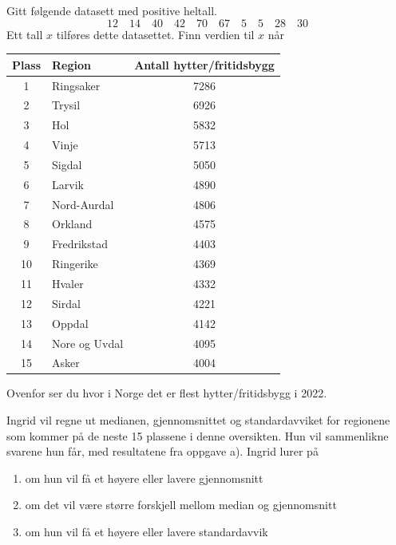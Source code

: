 Gitt følgende datasett med positive heltall.
\[ 12 \quad 14 \quad 40 \quad 42 \quad 70 \quad 67 \quad 5 \quad 5 \quad 28 \quad 30 \]
Ett tall $x$ tilføres dette datasettet. Finn verdien til $x$ når
\newpage
{}
\begin{table}[h]
	\centering
	\small
	\begin{tabular}{clc}
		\hline
		Plass & Region & Antall hytter/fritidsbygg \\
		\hline
		1  & Ringsaker     & 7286 \\ \hline
		2  & Trysil        & 6926 \\ \hline
		3  & Hol           & 5832 \\ \hline
		4  & Vinje         & 5713 \\ \hline
		5  & Sigdal        & 5050 \\ \hline
		6  & Larvik        & 4890 \\ \hline
		7  & Nord-Aurdal   & 4806 \\ \hline
		8  & Orkland       & 4575 \\ \hline
		9  & Fredrikstad   & 4403 \\ \hline
		10 & Ringerike     & 4369 \\ \hline
		11 & Hvaler        & 4332 \\ \hline
		12 & Sirdal        & 4221 \\ \hline
		13 & Oppdal        & 4142 \\ \hline
		14 & Nore og Uvdal & 4095 \\ \hline
		15 & Asker         & 4004 \\ 
		\hline
	\end{tabular}
\end{table}

Ovenfor ser du hvor i Norge det er flest hytter/fritidsbygg i 2022.


Ingrid vil regne ut medianen, gjennomsnittet og standardavviket for regionene som kommer på de neste 15 plassene i denne oversikten. Hun vil sammenlikne svarene hun får, med resultatene fra oppgave a). Ingrid lurer på
\begin{enumerate}
	\item[(i)] om hun vil få et høyere eller lavere gjennomsnitt
	\item[(ii)] om det vil være større forskjell mellom median og gjennomsnitt
	\item[(iii)] om hun vil få et høyere eller lavere standardavvik
\end{enumerate}


